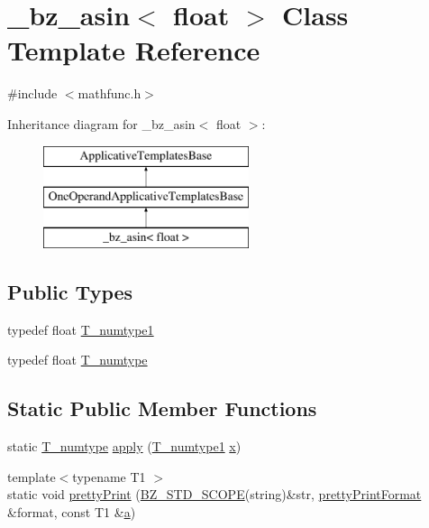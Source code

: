 \hypertarget{class__bz__asin_3_01float_01_4}{}\section{\+\_\+bz\+\_\+asin$<$ float $>$ Class Template Reference}
\label{class__bz__asin_3_01float_01_4}


{\ttfamily \#include $<$mathfunc.\+h$>$}

Inheritance diagram for \+\_\+bz\+\_\+asin$<$ float $>$\+:\begin{figure}[H]
\begin{center}
\leavevmode
\includegraphics[height=3.000000cm]{class__bz__asin_3_01float_01_4}
\end{center}
\end{figure}
\subsection*{Public Types}
\begin{DoxyCompactItemize}
\item 
typedef float \hyperlink{class__bz__asin_3_01float_01_4_abbcef3d56e790525510a6bb6de4dce19}{T\+\_\+numtype1}
\item 
typedef float \hyperlink{class__bz__asin_3_01float_01_4_a5bfa43e641657bfd18f2418b565187c6}{T\+\_\+numtype}
\end{DoxyCompactItemize}
\subsection*{Static Public Member Functions}
\begin{DoxyCompactItemize}
\item 
static \hyperlink{class__bz__asin_3_01float_01_4_a5bfa43e641657bfd18f2418b565187c6}{T\+\_\+numtype} \hyperlink{class__bz__asin_3_01float_01_4_aca226469f4b772192a9916b094cf2615}{apply} (\hyperlink{class__bz__asin_3_01float_01_4_abbcef3d56e790525510a6bb6de4dce19}{T\+\_\+numtype1} \hyperlink{vecnorm1_8cc_ac73eed9e41ec09d58f112f06c2d6cb63}{x})
\item 
{\footnotesize template$<$typename T1 $>$ }\\static void \hyperlink{class__bz__asin_3_01float_01_4_aab1bcba2fbc6648fee773fb28b604ea3}{pretty\+Print} (\hyperlink{numinquire_8h_a2b24ffc3b4ef9803956bc7715c6c7b83}{B\+Z\+\_\+\+S\+T\+D\+\_\+\+S\+C\+O\+P\+E}(string)\&str, \hyperlink{classprettyPrintFormat}{pretty\+Print\+Format} \&format, const T1 \&\hyperlink{gen__mat5files_8m_aae328bf20413f220e38aec4d95bfd6da}{a})
\end{DoxyCompactItemize}



